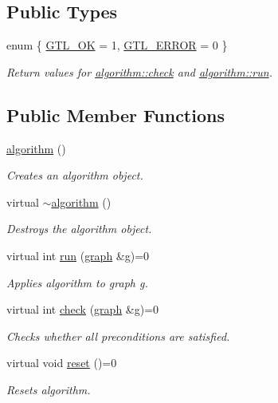 \subsection*{Public Types}
\begin{DoxyCompactItemize}
\item 
enum \{ \mbox{\hyperlink{classalgorithm_af1a0078e153aa99c24f9bdf0d97f6710a5114c20e4a96a76b5de9f28bf15e282b}{G\+T\+L\+\_\+\+OK}} = 1, 
\mbox{\hyperlink{classalgorithm_af1a0078e153aa99c24f9bdf0d97f6710a6fcf574690bbd6cf710837a169510dd7}{G\+T\+L\+\_\+\+E\+R\+R\+OR}} = 0
 \}
\begin{DoxyCompactList}\small\item\em Return values for \mbox{\hyperlink{classalgorithm_a76361fb03ad1cf643affc51821e43bed}{algorithm\+::check}} and \mbox{\hyperlink{classalgorithm_a734b189509a8d6b56b65f8ff772d43ca}{algorithm\+::run}}. \end{DoxyCompactList}\end{DoxyCompactItemize}
\subsection*{Public Member Functions}
\begin{DoxyCompactItemize}
\item 
\mbox{\hyperlink{classalgorithm_ab79e1ddec2f2afdf4b36b10724db8b15}{algorithm}} ()
\begin{DoxyCompactList}\small\item\em Creates an algorithm object. \end{DoxyCompactList}\item 
virtual \mbox{\hyperlink{classalgorithm_adca9b1e7fa3afd914519a9dbb44e9fd5}{$\sim$algorithm}} ()
\begin{DoxyCompactList}\small\item\em Destroys the algorithm object. \end{DoxyCompactList}\item 
virtual int \mbox{\hyperlink{classalgorithm_a734b189509a8d6b56b65f8ff772d43ca}{run}} (\mbox{\hyperlink{classgraph}{graph}} \&\mbox{\hyperlink{rings_8cpp_aa9df5aa3976a89a96a5f1c7611d42938}{g}})=0
\begin{DoxyCompactList}\small\item\em Applies algorithm to graph g. \end{DoxyCompactList}\item 
virtual int \mbox{\hyperlink{classalgorithm_a76361fb03ad1cf643affc51821e43bed}{check}} (\mbox{\hyperlink{classgraph}{graph}} \&\mbox{\hyperlink{rings_8cpp_aa9df5aa3976a89a96a5f1c7611d42938}{g}})=0
\begin{DoxyCompactList}\small\item\em Checks whether all preconditions are satisfied. \end{DoxyCompactList}\item 
virtual void \mbox{\hyperlink{classalgorithm_a21aba63d066ae7897de6ca7d8425c408}{reset}} ()=0
\begin{DoxyCompactList}\small\item\em Resets algorithm. \end{DoxyCompactList}\end{DoxyCompactItemize}



